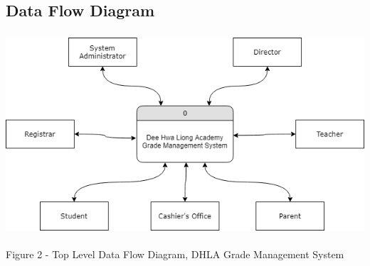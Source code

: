 \documentclass[11pt,a4paper,titlepage]{article}
\begin{document}
\newpage

\subsection{Data Flow Diagram}
\vspace{2cm}
\begin{center}
\includegraphics[height=7.5cm]{Data-Flow-Diagram-1.png}
\end{center}
\vspace{2cm}
\begin{center}
    Figure 2 - Top Level Data Flow Diagram, DHLA Grade Management System
\end{center}
\vspace{2cm}
\end{document}
